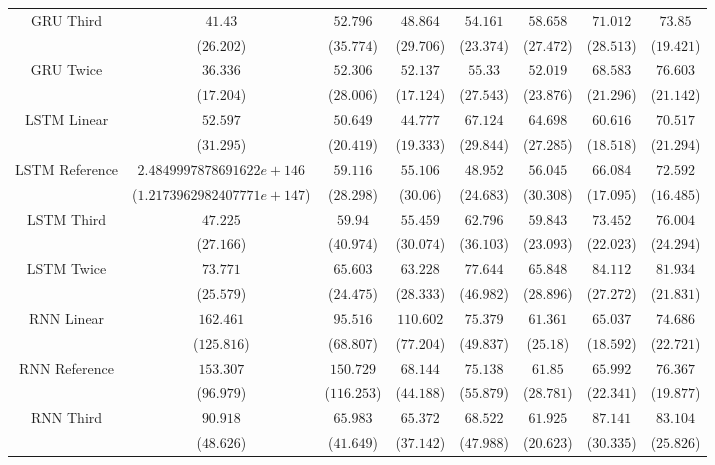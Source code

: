 \begin{table}[!ht]
{\begin{tabular}{|c|c|c|c|c|c|c|c|}
			\multirow{2}{*}{GRU Third} & $41.43$ & $52.796$ & $48.864$ & $54.161$ & $58.658$ & $71.012$ & $73.85$ \\
			 & ($26.202$) & ($35.774$) & ($29.706$) & ($23.374$) & ($27.472$) & ($28.513$) & ($19.421$) \\ \hline
			\multirow{2}{*}{GRU Twice} & $36.336$ & $52.306$ & $52.137$ & $55.33$ & $52.019$ & $68.583$ & $76.603$ \\
			 & ($17.204$) & ($28.006$) & ($17.124$) & ($27.543$) & ($23.876$) & ($21.296$) & ($21.142$) \\ \hline
			\multirow{2}{*}{LSTM Linear} & $52.597$ & $50.649$ & $44.777$ & $67.124$ & $64.698$ & $60.616$ & $70.517$ \\
			 & ($31.295$) & ($20.419$) & ($19.333$) & ($29.844$) & ($27.285$) & ($18.518$) & ($21.294$) \\ \hline
			\multirow{2}{*}{LSTM Reference} & $2.4849997878691622e+146$ & $59.116$ & $55.106$ & $48.952$ & $56.045$ & $66.084$ & $72.592$ \\
			 & ($1.2173962982407771e+147$) & ($28.298$) & ($30.06$) & ($24.683$) & ($30.308$) & ($17.095$) & ($16.485$) \\ \hline
			\multirow{2}{*}{LSTM Third} & $47.225$ & $59.94$ & $55.459$ & $62.796$ & $59.843$ & $73.452$ & $76.004$ \\
			 & ($27.166$) & ($40.974$) & ($30.074$) & ($36.103$) & ($23.093$) & ($22.023$) & ($24.294$) \\ \hline
			\multirow{2}{*}{LSTM Twice} & $73.771$ & $65.603$ & $63.228$ & $77.644$ & $65.848$ & $84.112$ & $81.934$ \\
			 & ($25.579$) & ($24.475$) & ($28.333$) & ($46.982$) & ($28.896$) & ($27.272$) & ($21.831$) \\ \hline
			\multirow{2}{*}{RNN Linear} & $162.461$ & $95.516$ & $110.602$ & $75.379$ & $61.361$ & $65.037$ & $74.686$ \\
			 & ($125.816$) & ($68.807$) & ($77.204$) & ($49.837$) & ($25.18$) & ($18.592$) & ($22.721$) \\ \hline
			\multirow{2}{*}{RNN Reference} & $153.307$ & $150.729$ & $68.144$ & $75.138$ & $61.85$ & $65.992$ & $76.367$ \\
			 & ($96.979$) & ($116.253$) & ($44.188$) & ($55.879$) & ($28.781$) & ($22.341$) & ($19.877$) \\ \hline
			\multirow{2}{*}{RNN Third} & $90.918$ & $65.983$ & $65.372$ & $68.522$ & $61.925$ & $87.141$ & $83.104$ \\
			 & ($48.626$) & ($41.649$) & ($37.142$) & ($47.988$) & ($20.623$) & ($30.335$) & ($25.826$) \\ \hline

\end{tabular}}
\end{table}
